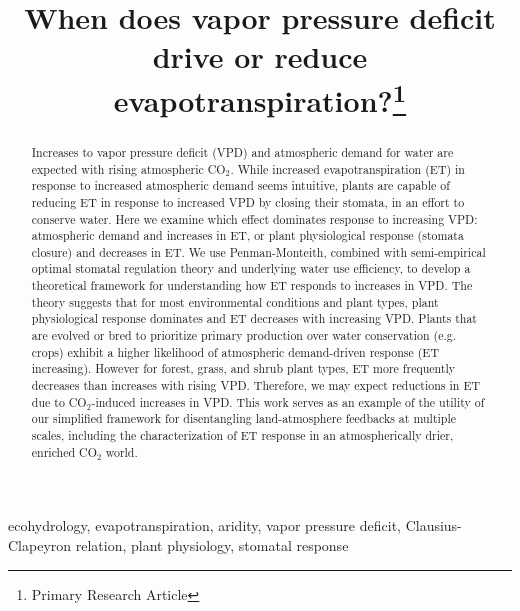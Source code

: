 \documentclass[draft,linenumbers]{agujournal}
\begin{document}
\title{When does vapor pressure deficit drive or reduce
evapotranspiration?\footnote{Primary Research Article}}



 


\begin{keypoints}
\item ecohydrology, evapotranspiration, aridity, vapor pressure
deficit, Clausius-Clapeyron relation, plant physiology, stomatal
response
\end{keypoints}


\begin{abstract} Increases to vapor pressure deficit (VPD) and
atmospheric demand for water are expected with rising atmospheric
CO$_2$. While increased evapotranspiration (ET) in response to
increased atmospheric demand seems intuitive, plants are capable of
reducing ET in response to increased VPD by closing their stomata, in
an effort to conserve water. Here we examine which effect dominates
response to increasing VPD: atmospheric demand and increases in ET, or
plant physiological response (stomata closure) and decreases in ET. We
use Penman-Monteith, combined with semi-empirical optimal stomatal
regulation theory and underlying water use efficiency, to develop a
theoretical framework for understanding how ET responds to increases
in VPD.  The theory suggests that for most environmental conditions
and plant types, plant physiological response dominates and ET
decreases with increasing VPD. Plants that are evolved or bred to
prioritize primary production over water conservation (e.g. crops)
exhibit a higher likelihood of atmospheric demand-driven response (ET
increasing). However for forest, grass, and shrub plant types, ET more
frequently decreases than increases with rising VPD. Therefore, we may
expect reductions in ET due to CO$_2$-induced increases in VPD. This
work serves as an example of the utility of our simplified framework
for disentangling land-atmosphere feedbacks at multiple scales,
including the characterization of ET response in an atmospherically
drier, enriched CO$_2$ world.
 
\end{abstract}
\end{document}
